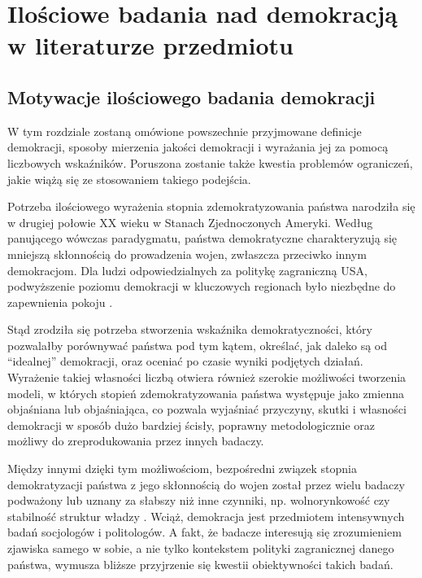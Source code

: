 \documentclass[12pt]{article}
\begin{document}
\newpage

\hypertarget{iloux15bciowe-badania-nad-demokracjux105-w-literaturze-przedmiotu}{%
\section{Ilościowe badania nad demokracją w literaturze przedmiotu}\label{iloux15bciowe-badania-nad-demokracjux105-w-literaturze-przedmiotu}}

\hypertarget{motywacje-iloux15bciowego-badania-demokracji}{%
\subsection{Motywacje ilościowego badania demokracji}\label{motywacje-iloux15bciowego-badania-demokracji}}

W tym rozdziale zostaną omówione powszechnie przyjmowane definicje demokracji, sposoby mierzenia jakości demokracji i wyrażania jej za pomocą liczbowych wskaźników. Poruszona zostanie także kwestia problemów ograniczeń, jakie wiążą się ze stosowaniem takiego podejścia.

Potrzeba ilościowego wyrażenia stopnia zdemokratyzowania państwa narodziła się w drugiej połowie XX wieku w Stanach Zjednoczonych Ameryki. Według panującego wówczas paradygmatu, państwa demokratyczne charakteryzują się mniejszą skłonnością do prowadzenia wojen, zwłaszcza przeciwko innym demokracjom. Dla ludzi odpowiedzialnych za politykę zagraniczną USA, podwyższenie poziomu demokracji w kluczowych regionach było niezbędne do zapewnienia pokoju \citep{Doorenspleet}.

Stąd zrodziła się potrzeba stworzenia wskaźnika demokratyczności, który pozwalałby porównywać państwa pod tym kątem, określać, jak daleko są od ``idealnej'' demokracji, oraz oceniać po czasie wyniki podjętych działań. Wyrażenie takiej własności liczbą otwiera również szerokie możliwości tworzenia modeli, w których stopień zdemokratyzowania państwa występuje jako zmienna objaśniana lub objaśniająca, co pozwala wyjaśniać przyczyny, skutki i własności demokracji w sposób dużo bardziej ścisły, poprawny metodologicznie oraz możliwy do zreprodukowania przez innych badaczy.

Między innymi dzięki tym możliwościom, bezpośredni związek stopnia demokratyzacji państwa z jego skłonnością do wojen został przez wielu badaczy podważony lub uznany za słabszy niż inne czynniki, np. wolnorynkowość czy stabilność struktur władzy \citep{Doorenspleet}. Wciąż, demokracja jest przedmiotem intensywnych badań socjologów i politologów. A fakt, że badacze interesują się zrozumieniem zjawiska samego w sobie, a nie tylko kontekstem polityki zagranicznej danego państwa, wymusza bliższe przyjrzenie się kwestii obiektywności takich badań.
\end{document}
